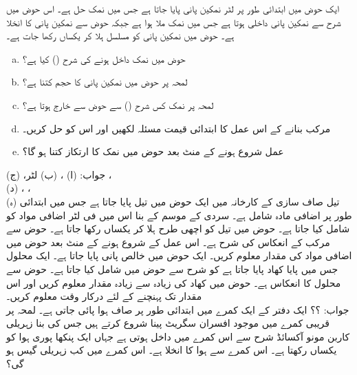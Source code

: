 ایک حوض میں ابتدائی طور پر  لٹر نمکین پانی پایا جاتا ہے جس میں  نمک حل ہے۔ اس حوض میں  شرح سے نمکین پانی داخلی ہوتا ہے جس میں  نمک ملا ہوا ہے جبکہ حوض سے نمکین پانی کا انخلا  ہے۔ حوض میں نمکین پانی کو مسلسل ہلا کر یکساں رکھا جات ہے۔
\begin{enumerate}[a.]
\item
حوض میں نمک داخل ہونے کی شرح () کیا ہے؟
\item
لمحہ  پر حوض میں نمکین پانی کا حجم کتنا ہے؟
\item
لمحہ  پر نمک کس شرح () سے حوض سے خارج ہوتا ہے؟
\item
 مرکب بنانے کے اس عمل کا ابتدائی قیمت مسئلہ لکھیں اور اس کو حل کریں۔
\item
عمل شروع ہونے کے  منٹ بعد حوض میں نمک کا ارتکاز کتنا ہو گا؟ 
\end{enumerate}
جواب:\quad
(ا) ، (ب)  لٹر، (ج) ،\\ (د) ، ،\\
(ہ) 
تیل صاف سازی کے کارخانہ میں ایک حوض میں  تیل پایا جاتا ہے جس میں ابتدائی طور پر  اضافی مادہ شامل ہے۔ سردی کے موسم کے بنا اس میں  فی لٹر اضافی مواد کو   شامل کیا جاتا ہے۔ حوض میں تیل کو اچھی طرح ہلا کر یکساں رکھا جاتا ہے۔ حوض سے مرکب کے انعکاس  کی شرح  ہے۔ اس عمل کے شروع ہونے کے  منٹ بعد حوض میں اضافی مواد کی مقدار معلوم کریں۔
ایک حوض میں  خالص پانی پایا جاتا ہے۔ ایک محلول جس میں  پایا کھاد پایا جاتا ہے کو  شرح سے حوض میں شامل کیا جاتا ہے۔ حوض سے محلول کا انعکاس  ہے۔ حوض میں کھاد کی زیادہ سے زیادہ مقدار معلوم کریں اور اس مقدار تک پہنچنے کے لئے درکار وقت معلوم کریں۔\\
جواب:\quad
؟؟  
ایک دفتر کے ایک کمرے میں ابتدائی طور پر  صاف ہوا پائی جاتی ہے۔ لمحہ  پر قریبی کمرے  میں موجود افسران سگریٹ پینا شروع کرتے ہیں جس کی بنا  زہریلی کاربن مونو آکسائڈ  شرح سے اس کمرے  میں داخل ہوتی ہے جہاں ایک پنکھا پوری ہوا کو یکساں رکھتا ہے۔ اس کمرے سے ہوا کا انخلا  ہے۔ اس کمرے میں کب زہریلی گیس  ہو گی؟


